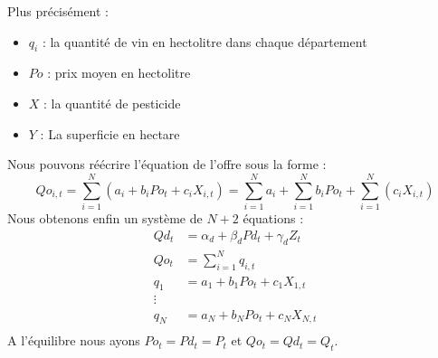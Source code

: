 \documentclass[11pt, a4paper]{article}
\begin{document}
Plus précisément :
\begin{itemize}
  \item $q_i$ : la quantité de vin en hectolitre dans chaque département
  \item $Po$ : prix moyen en hectolitre
  \item $X$ : la quantité de pesticide
  \item $Y$ : La superficie en hectare
\end{itemize}
Nous pouvons réécrire l'équation de l'offre sous la forme :
\begin{equation}
    Qo_{i,t} = \sum_{i = 1}^{N} (a_i + b_i Po_{t} + c_i X_{i,t}) = \sum_{i = 1}^{N} a_i + \sum_{i = 1}^{N} b_i Po_{t} + \sum_{i = 1}^{N} (c_i X_{i,t})
\end{equation}
Nous obtenons enfin un système de $N + 2$ équations : 
\begin{align*}
    Qd_t & = \alpha_d + \beta_d Pd_t + \gamma_d Z_t \\
    Qo_t & = \sum_{i = 1}^{N} q_{i,t} \\
    q_1 & = a_1 + b_1 Po_{t} + c_1 X_{1,t} \\ 
    \vdots \\ 
    q_N & = a_N + b_N Po_{t} + c_N X_{N,t} \\
\end{align*}
A l'équilibre nous ayons $Po_t = Pd_t = P_t$ et $Qo_t = Qd_t = Q_t$.
\end{document}
